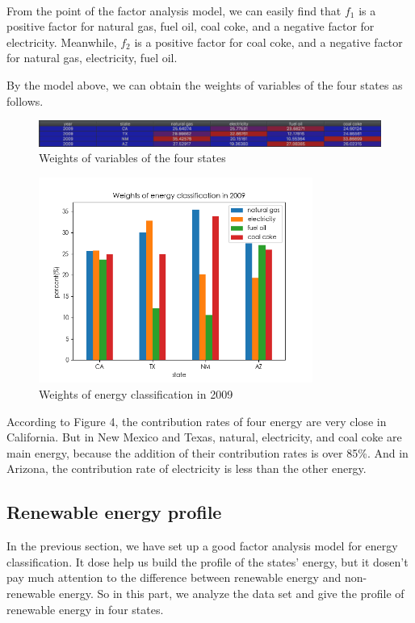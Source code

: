 \documentclass[a4paper,11pt]{article}
\begin{document}
\textrm{\\}
\par From the point of the factor analysis model, we can easily find that $f_1$ is a positive factor for natural gas, fuel oil, coal coke, and a negative factor for electricity. Meanwhile, $f_2$ is a positive factor for coal coke, and a negative factor for natural gas, electricity, fuel oil. 
\par By the model above, we can obtain the weights of variables of the four states as follows.
\begin{figure}[!hptb] 
    \centering 
    \includegraphics[width=1.0\textwidth]{weights.jpg}
    \caption{Weights of variables of the four states}
\end{figure}
\begin{figure}[!hptb] 
    \centering 
    \includegraphics[width=0.8\textwidth]{1-1.png}
    \caption{Weights of energy classification in 2009}
\end{figure}
According to Figure 4, the contribution rates of four energy are very close in California. But in New Mexico and Texas, natural, electricity, and coal coke are main energy, because the addition of their contribution rates is over 85\%. And in Arizona, the contribution rate of electricity is less than the other energy. 


\subsection{Renewable energy profile}

\par In the previous section, we have set up a good factor analysis model for energy classification. It dose help us build the profile of the states' energy, but it dosen't pay much attention to the difference between renewable energy and non-renewable energy. So in this part, we analyze the data set and give the profile of renewable energy in four states.
\end{document}
